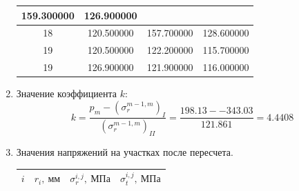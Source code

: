 \documentclass[a4paper,10pt]{article}
\begin{document}
\begin{enumerate}
\begin{center}
\begin{tabular}{|c|c|c|c|}
159.300000 & 126.900000 \\ \hline 18 & 120.500000 & 157.700000 & 128.600000 \\ \hline 19 & 120.500000 & 122.200000 & 115.700000 \\ \hline 19 & 126.900000 & 121.900000 & 116.000000 \\ \hline 
\end{tabular} 
\end{center}

\item Значение коэффициента $k$:
\[k = \frac{p_m - (\sigma_r^{m-1, m})_I}{(\sigma_r^{m-1, m})_{II}} = 
\frac{198.13 - -343.03}{121.861} = 4.4408\]

\item Значения напряжений на участках после пересчета.

\begin{center}
\begin{tabular}{|c|c|c|c|}
\hline 
$i$ & $r_i,\ мм$ & $\sigma_r^{i,j},\ МПа$ & $\sigma_t^{i,j},\ МПа$ \\ 
\hline 


\end{tabular}
\end{center}
\end{enumerate}
\end{document}
